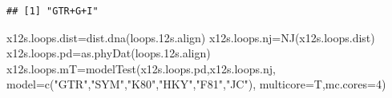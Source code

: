 \documentclass[
]{article}
\newenvironment{Shaded}{\begin{snugshade}}{\end{snugshade}}
\newcommand{\AttributeTok}[1]{\textcolor[rgb]{0.77,0.63,0.00}{#1}}
\newcommand{\DecValTok}[1]{\textcolor[rgb]{0.00,0.00,0.81}{#1}}
\newcommand{\FloatTok}[1]{\textcolor[rgb]{0.00,0.00,0.81}{#1}}
\newcommand{\FunctionTok}[1]{\textcolor[rgb]{0.00,0.00,0.00}{#1}}
\newcommand{\NormalTok}[1]{#1}
\newcommand{\OtherTok}[1]{\textcolor[rgb]{0.56,0.35,0.01}{#1}}
\newcommand{\SpecialCharTok}[1]{\textcolor[rgb]{0.00,0.00,0.00}{#1}}
\newcommand{\StringTok}[1]{\textcolor[rgb]{0.31,0.60,0.02}{#1}}
\begin{document}
\begin{Shaded}
\end{Shaded}

\begin{verbatim}
## [1] "GTR+G+I"
\end{verbatim}

\begin{Shaded}
\end{Shaded}

\begin{Shaded}
\begin{Highlighting}[]
\NormalTok{x12s.loops.dist}\OtherTok{=}\FunctionTok{dist.dna}\NormalTok{(loops}\FloatTok{.12}\NormalTok{s.align)}
\NormalTok{x12s.loops.nj}\OtherTok{=}\FunctionTok{NJ}\NormalTok{(x12s.loops.dist)}
\NormalTok{x12s.loops.pd}\OtherTok{=}\FunctionTok{as.phyDat}\NormalTok{(loops}\FloatTok{.12}\NormalTok{s.align)}
\NormalTok{x12s.loops.mT}\OtherTok{=}\FunctionTok{modelTest}\NormalTok{(x12s.loops.pd,x12s.loops.nj,}
                        \AttributeTok{model=}\FunctionTok{c}\NormalTok{(}\StringTok{"GTR"}\NormalTok{,}\StringTok{"SYM"}\NormalTok{,}\StringTok{"K80"}\NormalTok{,}\StringTok{"HKY"}\NormalTok{,}\StringTok{"F81"}\NormalTok{,}\StringTok{"JC"}\NormalTok{),}
                        \AttributeTok{multicore=}\NormalTok{T,}\AttributeTok{mc.cores=}\DecValTok{4}\NormalTok{)}
\end{Highlighting}
\end{Shaded}
\end{document}
